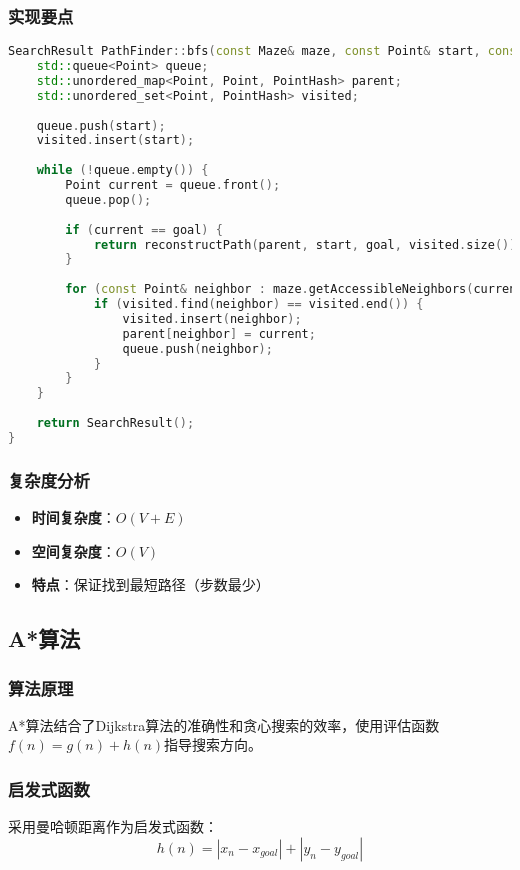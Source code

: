 \documentclass[UTF8]{ctexart}
\begin{document}
\subsubsection{实现要点}
\begin{lstlisting}[language=C++]
SearchResult PathFinder::bfs(const Maze& maze, const Point& start, const Point& goal) {
    std::queue<Point> queue;
    std::unordered_map<Point, Point, PointHash> parent;
    std::unordered_set<Point, PointHash> visited;
    
    queue.push(start);
    visited.insert(start);
    
    while (!queue.empty()) {
        Point current = queue.front();
        queue.pop();
        
        if (current == goal) {
            return reconstructPath(parent, start, goal, visited.size());
        }
        
        for (const Point& neighbor : maze.getAccessibleNeighbors(current)) {
            if (visited.find(neighbor) == visited.end()) {
                visited.insert(neighbor);
                parent[neighbor] = current;
                queue.push(neighbor);
            }
        }
    }
    
    return SearchResult();
}
\end{lstlisting}

\subsubsection{复杂度分析}
\begin{itemize}
    \item \textbf{时间复杂度}：$O(V + E)$
    \item \textbf{空间复杂度}：$O(V)$
    \item \textbf{特点}：保证找到最短路径（步数最少）
\end{itemize}

\subsection{A*算法}

\subsubsection{算法原理}
A*算法结合了Dijkstra算法的准确性和贪心搜索的效率，使用评估函数$f(n) = g(n) + h(n)$指导搜索方向。

\subsubsection{启发式函数}
采用曼哈顿距离作为启发式函数：
$$h(n) = |x_n - x_{goal}| + |y_n - y_{goal}|$$
\end{document}

